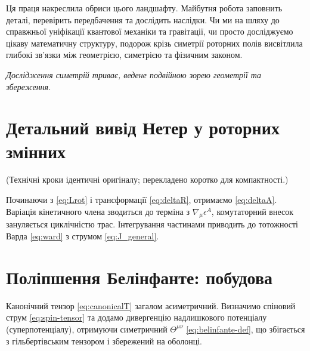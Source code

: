 \documentclass[11pt,a4paper]{article}
\numberwithin{equation}{section}
\theoremstyle{plain}
\theoremstyle{definition}
\theoremstyle{remark}
\newif\ifack
\begin{document}
Ця праця накреслила обриси цього ландшафту. Майбутня робота заповнить деталі, перевірить передбачення та дослідить наслідки. Чи ми на шляху до справжньої уніфікації квантової механіки та гравітації, чи просто досліджуємо цікаву математичну структуру, подорож крізь симетрії роторних полів висвітлила глибокі зв'язки між геометрією, симетрією та фізичним законом.

\medskip
\noindent\textit{Дослідження симетрій триває, ведене подвійною зорею геометрії та збереження.}

\ifack
\section*{Подяки}
Автор завдячує Еммі Нетер, чия теорема вела покоління фізиків. Розвиток геометричної алгебри Девідом Гестенесом і її застосування до гравітації Ентоні Лазенбі, Крісом Дораном та Стівеном Галлом стали наріжними каменями. Роботу виконано незалежно, без зовнішнього фінансування. За можливі похибки відповідає автор.
\fi

\appendix

\section{Детальний вивід Нетер у роторних змінних}
\label{app:noether-deriv}

(Технічні кроки ідентичні оригіналу; перекладено коротко для компактності.)

Починаючи з \eqref{eq:Lrot} і трансформації \eqref{eq:deltaR}, отримаємо \eqref{eq:deltaA}. Варіація кінетичного члена зводиться до терміна з $\nabla_\mu\epsilon^A$, комутаторний внесок зануляється циклічністю трас. Інтегрування частинами приводить до тотожності Варда \eqref{eq:ward} з струмом \eqref{eq:J_general}.

\section{Поліпшення Белінфанте: побудова}
\label{app:belinfante}

Канонічний тензор \eqref{eq:canonicalT} загалом асиметричний. Визначимо спіновий струм \eqref{eq:spin-tensor} та додамо дивергенцію надлишкового потенціалу (суперпотенціалу), отримуючи симетричний $\Theta^{\mu\nu}$ \eqref{eq:belinfante-def}, що збігається з гільбертівським тензором і збережений на оболонці.
\end{document}
